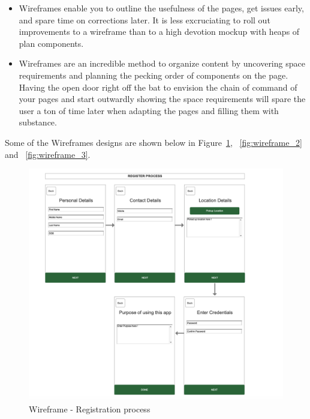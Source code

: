 \begin{itemize}
    \item Wireframes enable you to outline the usefulness of the pages, get issues early, and spare time on corrections later. It is less excruciating to roll out improvements to a wireframe than to a high devotion mockup with heaps of plan components. \\
    \item Wireframes are an incredible method to organize content by uncovering space requirements and planning the pecking order of components on the page. Having the open door right off the bat to envision the chain of command of your pages and start outwardly showing the space requirements will spare the user a ton of time later when adapting the pages and filling them with substance. \\
\end{itemize}

\newpage

Some of the Wireframes designs are shown below in Figure~\ref{fig:wireframe_1}, ~\ref{fig:wireframe_2} and ~\ref{fig:wireframe_3}.

    \begin{figure}[H]
            \centering
            \includegraphics[width=1.0\linewidth]{figures/ch3/wireframe_1.png}
            \caption{\label{fig:wireframe_1} Wireframe - Registration process}
    \end{figure}
  
